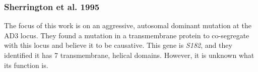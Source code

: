 \documentclass[12pt]{report}
\begin{document}
\subsubsection*{Sherrington et al. 1995}

The focus of this work is on an aggressive, autosomal dominant mutation at the AD3 locus. They found a mutation in a transmembrane protein to co-segregate with this locus and believe it to be causative. This gene is \textit{S182}, and they identified it has 7 transmembrane, helical domains. However, it is unknown what its function is. 
\end{document}
